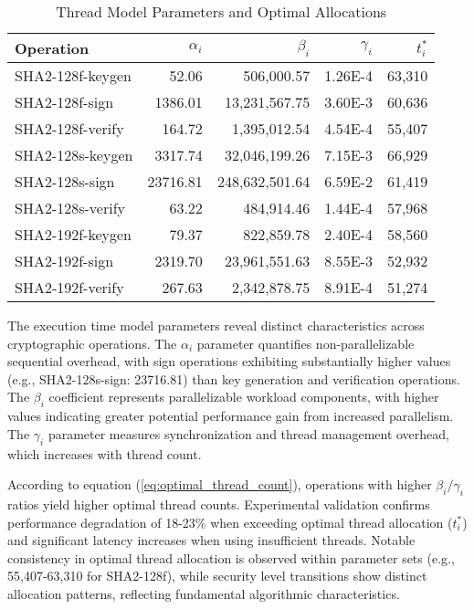 \documentclass[journal]{IEEEtran}
\begin{document}
\begin{table}[h]
  \centering
  \caption{Thread Model Parameters and Optimal Allocations}
  \label{tab:thread_model_params}
  \begin{tabular}{@{}lrrrr@{}}
    \toprule
    \textbf{Operation} & \boldmath$\alpha_i$ & \boldmath$\beta_i$ & \boldmath$\gamma_i$ & \boldmath$t_i^*$ \\
    \midrule
    SHA2-128f-keygen & 52.06 & 506,000.57 & 1.26E-4 & 63,310 \\
    SHA2-128f-sign & 1386.01 & 13,231,567.75 & 3.60E-3 & 60,636 \\
    SHA2-128f-verify & 164.72 & 1,395,012.54 & 4.54E-4 & 55,407 \\
    SHA2-128s-keygen & 3317.74 & 32,046,199.26 & 7.15E-3 & 66,929 \\
    SHA2-128s-sign & 23716.81 & 248,632,501.64 & 6.59E-2 & 61,419 \\
    SHA2-128s-verify & 63.22 & 484,914.46 & 1.44E-4 & 57,968 \\
    SHA2-192f-keygen & 79.37 & 822,859.78 & 2.40E-4 & 58,560 \\
    SHA2-192f-sign & 2319.70 & 23,961,551.63 & 8.55E-3 & 52,932 \\
    SHA2-192f-verify & 267.63 & 2,342,878.75 & 8.91E-4 & 51,274 \\
    \bottomrule
  \end{tabular}
\end{table}

\color{blue}

The execution time model parameters reveal distinct characteristics across cryptographic operations. The $\alpha_i$ parameter quantifies non-parallelizable sequential overhead, with sign operations exhibiting substantially higher values (e.g., SHA2-128s-sign: 23716.81) than key generation and verification operations. The $\beta_i$ coefficient represents parallelizable workload components, with higher values indicating greater potential performance gain from increased parallelism. The $\gamma_i$ parameter measures synchronization and thread management overhead, which increases with thread count.

According to equation (\ref{eq:optimal_thread_count}), operations with higher $\beta_i/\gamma_i$ ratios yield higher optimal thread counts. Experimental validation confirms performance degradation of 18-23\% when exceeding optimal thread allocation ($t_i^*$) and significant latency increases when using insufficient threads. Notable consistency in optimal thread allocation is observed within parameter sets (e.g., 55,407-63,310 for SHA2-128f), while security level transitions show distinct allocation patterns, reflecting fundamental algorithmic characteristics.
\end{document}
